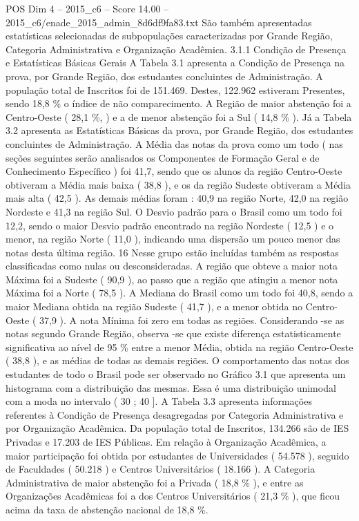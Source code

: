 \begin{textsample}{POS Dim 4 – 2015\_c6 – Score 14.00 – 2015\_c6/enade\_2015\_admin\_8d6df9fa83.txt}
São também apresentadas estatísticas selecionadas de subpopulações caracterizadas por Grande Região, Categoria Administrativa e Organização Acadêmica. 3.1.1 Condição de Presença e Estatísticas Básicas Gerais A Tabela 3.1 apresenta a Condição de Presença na prova, por Grande Região, dos estudantes concluintes de Administração.
A população total de Inscritos foi de 151.469.
Destes, 122.962 estiveram Presentes, sendo 18,8 \% o índice de não comparecimento.
A Região de maior abstenção foi a Centro-Oeste ( 28,1 \%, ) e a de menor abstenção foi a Sul ( 14,8 \% ).
Já a Tabela 3.2 apresenta as Estatísticas Básicas da prova, por Grande Região, dos estudantes concluintes de Administração.
A Média das notas da prova como um todo ( nas seções seguintes serão analisados os Componentes de Formação Geral e de Conhecimento Específico ) foi 41,7, sendo que os alunos da região Centro-Oeste obtiveram a Média mais baixa ( 38,8 ), e os da região Sudeste obtiveram a Média mais alta ( 42,5 ).
As demais médias foram : 40,9 na região Norte, 42,0 na região Nordeste e 41,3 na região Sul.
O Desvio padrão para o Brasil como um todo foi 12,2, sendo o maior Desvio padrão encontrado na região Nordeste ( 12,5 ) e o menor, na região Norte ( 11,0 ), indicando uma dispersão um pouco menor das notas desta última região. 16 Nesse grupo estão incluídas também as respostas classificadas como nulas ou desconsideradas.
A região que obteve a maior nota Máxima foi a Sudeste ( 90,9 ), ao passo que a região que atingiu a menor nota Máxima foi a Norte ( 78,5 ).
A Mediana do Brasil como um todo foi 40,8, sendo a maior Mediana obtida na região Sudeste ( 41,7 ), e a menor obtida no Centro-Oeste ( 37,9 ).
A nota Mínima foi zero em todas as regiões.
Considerando -se as notas segundo Grande Região, observa -se que existe diferença estatisticamente significativa ao nível de 95 \% entre a menor Média, obtida na região Centro-Oeste ( 38,8 ), e as médias de todas as demais regiões.
O comportamento das notas dos estudantes de todo o Brasil pode ser observado no Gráfico 3.1 que apresenta um histograma com a distribuição das mesmas.
Essa é uma distribuição unimodal com a moda no intervalo ( 30 ; 40 ].
A Tabela 3.3 apresenta informações referentes à Condição de Presença desagregadas por Categoria Administrativa e por Organização Acadêmica.
Da população total de Inscritos, 134.266 são de IES Privadas e 17.203 de IES Públicas.
Em relação à Organização Acadêmica, a maior participação foi obtida por estudantes de Universidades ( 54.578 ), seguido de Faculdades ( 50.218 ) e Centros Universitários ( 18.166 ).
A Categoria Administrativa de maior abstenção foi a Privada ( 18,8 \% ), e entre as Organizações Acadêmicas foi a dos Centros Universitários ( 21,3 \% ), que ficou acima da taxa de abstenção nacional de 18,8 \%.

\end{textsample}
